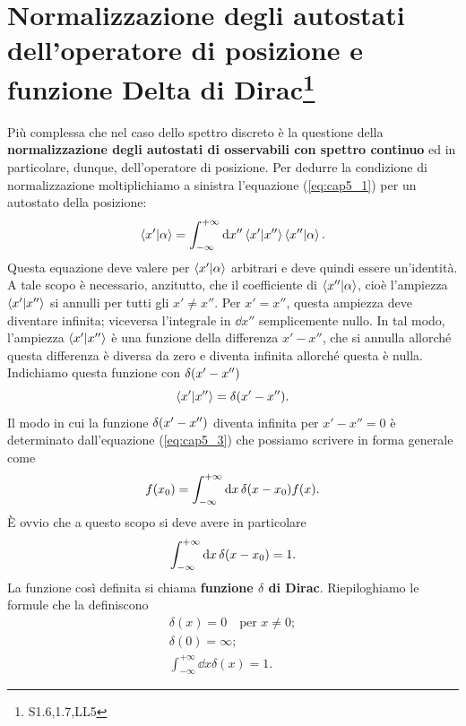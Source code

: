 \documentclass[a4paper,12pt,oneside]{book}
\begin{document}
\section[Normalizzazione degli autostati dell'operatore di posizione e funzione Delta di Dirac]{Normalizzazione degli autostati dell'operatore di posizione e funzione Delta di Dirac\footnote{ S1.6,1.7,LL5}}
Più complessa che nel caso dello spettro discreto è la questione della \textbf{normalizzazione degli autostati di osservabili con spettro continuo}
 ed in particolare, dunque, dell'operatore di posizione.
 Per dedurre la condizione di normalizzazione moltiplichiamo a sinistra l'equazione (\ref{eq:cap5_1}) per un autostato della posizione:
 \begin{equation}
   \label{eq:cap5_3}
   \braket{x'}{\alpha} = \int_{-\infty}^{+\infty}\dd{x''}\braket{x'}{x''}\braket{x''}{\alpha} .
 \end{equation}
Questa equazione deve valere per $\braket{x'}{\alpha}$ arbitrari e deve quindi essere un'identità. A tale scopo è necessario, anzitutto, che il coefficiente di $\braket{x''}{\alpha}$, cioè l'ampiezza $\braket{x'}{x''}$ si annulli per tutti gli $x'\neq x''$. Per $x'=x''$, questa ampiezza deve diventare infinita; viceversa l'integrale in $\dd{x''}$ semplicemente nullo. In tal modo, l'ampiezza $\braket{x'}{x''}$ è una funzione della differenza $x'-x''$, che si annulla allorché questa differenza è diversa da zero e diventa infinita allorché questa è nulla. Indichiamo questa funzione con $\delta\qty(x'-x'')$
\begin{equation}
  \braket{x'}{x''} = \delta\qty(x'-x'') .
\end{equation}
Il modo in cui la funzione $\delta\qty(x'-x'')$ diventa infinita per $x'-x''=0$ è determinato dall'equazione (\ref{eq:cap5_3}) che possiamo scrivere in forma generale come
\begin{equation}
  f\qty(x_0) = \int_{-\infty}^{+\infty}\dd{x}\delta\qty(x-x_0)f\qty(x) .
\end{equation}
È ovvio che a questo scopo si deve avere in particolare
\begin{equation}
  \int_{-\infty}^{+\infty}\dd{x}\delta\qty(x-x_0) = 1 .
\end{equation}
La funzione così definita si chiama \textbf{funzione $\delta$ di Dirac}.
Riepiloghiamo le formule che la definiscono
\begin{align}
  \delta(x) = 0 \quad \text{per }x\neq 0 ; \\
  \delta(0) = \infty ; \\
  \int_{-\infty}^{+\infty}\dd{x}\delta(x)=1 .
\end{align}
\end{document}
